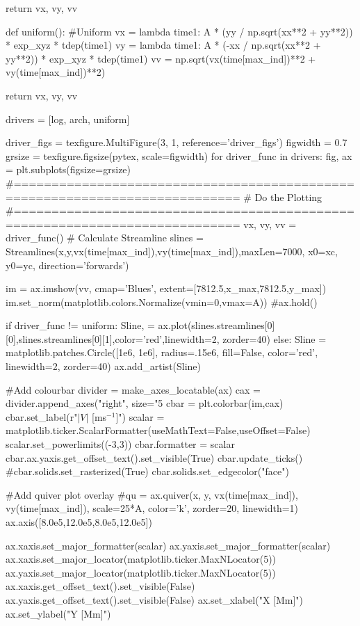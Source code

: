 \begin{pycode}[chapter4]
    return vx, vy, vv

def uniform():
    #Uniform
    vx = lambda time1: A * (yy / np.sqrt(xx**2 + yy**2)) * exp_xyz * tdep(time1)
    vy = lambda time1: A * (-xx / np.sqrt(xx**2 + yy**2)) * exp_xyz * tdep(time1)
    vv = np.sqrt(vx(time[max_ind])**2 + vy(time[max_ind])**2)

    return vx, vy, vv

drivers = [log, arch, uniform]

driver_figs = texfigure.MultiFigure(3, 1, reference='driver_figs')
figwidth = 0.7
grsize = texfigure.figsize(pytex, scale=figwidth)
for driver_func in drivers:
    fig, ax = plt.subplots(figsize=grsize)
    #============================================================================
    # Do the Plotting
    #============================================================================
    vx, vy, vv = driver_func()
    # Calculate Streamline
    slines = Streamlines(x,y,vx(time[max_ind]),vy(time[max_ind]),maxLen=7000,
                         x0=xc, y0=yc, direction='forwards')

    im = ax.imshow(vv, cmap='Blues', extent=[7812.5,x_max,7812.5,y_max])
    im.set_norm(matplotlib.colors.Normalize(vmin=0,vmax=A))
    #ax.hold()

    if driver_func != uniform:
        Sline, = ax.plot(slines.streamlines[0][0],slines.streamlines[0][1],color='red',linewidth=2, zorder=40)
    else:
        Sline = matplotlib.patches.Circle([1e6, 1e6], radius=.15e6, fill=False, color='red', linewidth=2, zorder=40)
        ax.add_artist(Sline)

    #Add colourbar
    divider = make_axes_locatable(ax)
    cax = divider.append_axes("right", size="5%
    cbar = plt.colorbar(im,cax)
    cbar.set_label(r"$|V|$ [ms$^{-1}$]")
    scalar = matplotlib.ticker.ScalarFormatter(useMathText=False,useOffset=False)
    scalar.set_powerlimits((-3,3))
    cbar.formatter = scalar
    cbar.ax.yaxis.get_offset_text().set_visible(True)
    cbar.update_ticks()
    #cbar.solids.set_rasterized(True)
    cbar.solids.set_edgecolor("face")

    #Add quiver plot overlay
    #qu = ax.quiver(x, y, vx(time[max_ind]), vy(time[max_ind]), scale=25*A, color='k', zorder=20, linewidth=1)
    ax.axis([8.0e5,12.0e5,8.0e5,12.0e5])

    ax.xaxis.set_major_formatter(scalar)
    ax.yaxis.set_major_formatter(scalar)
    ax.xaxis.set_major_locator(matplotlib.ticker.MaxNLocator(5))
    ax.yaxis.set_major_locator(matplotlib.ticker.MaxNLocator(5))
    ax.xaxis.get_offset_text().set_visible(False)
    ax.yaxis.get_offset_text().set_visible(False)
    ax.set_xlabel("X [Mm]")
    ax.set_ylabel("Y [Mm]")


\end{pycode}
